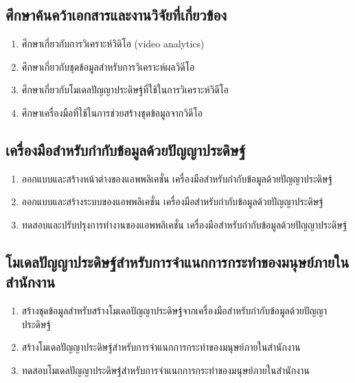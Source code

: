 \subsection*{ศึกษาค้นคว้าเอกสารและงานวิจัยที่เกี่ยวข้อง}
\begin{enumerate}\setlength\itemsep{-0.25em}
	\item ศึกษาเกี่ยวกับการวิเคราะห์วิดิโอ (video analytics)
	\item ศึกษาเกี่ยวกับชุดข้อมูลสำหรับการวิเคราะห์ผลวิดีโอ
	\item ศึกษาเกี่ยวกับโมเดลปัญญาประดิษฐ์ที่ใช้ในการวิเคราะห์วิดีโอ
	\item ศึกษาเครื่องมือที่ใช้ในการช่วยสร้างชุดข้อมูลจากวิดีโอ
\end{enumerate}
\subsection*{เครื่องมือสำหรับกำกับข้อมูลด้วยปัญญาประดิษฐ์}
\begin{enumerate}\setlength\itemsep{-0.25em}
	\item ออกแบบและสร้างหน้าต่างของแอพพลิเคชั่น เครื่องมือสำหรับกำกับข้อมูลด้วยปัญญาประดิษฐ์
	\item ออกแบบและสร้างระบบของแอพพลิเคชั่น เครื่องมือสำหรับกำกับข้อมูลด้วยปัญญาประดิษฐ์
	\item ทดสอบและปรับปรุงการทำงานของแอพพลิเคชั่น เครื่องมือสำหรับกำกับข้อมูลด้วยปัญญาประดิษฐ์
\end{enumerate}
\subsection*{โมเดลปัญญาประดิษฐ์สำหรับการจำแนกการกระทำของมนุษย์ภายในสำนักงาน}
\begin{enumerate}\setlength\itemsep{-0.25em}
	\item สร้างชุดข้อมูลสำหรับสร้างโมเดลปัญญาประดิษฐ์จากเครื่องมือสำหรับกำกับข้อมูลด้วยปัญญาประดิษฐ์
	\item สร้างโมเดลปัญญาประดิษฐ์สำหรับการจำแนกการกระทำของมนุษย์ภายในสำนักงาน
	\item ทดสอบโมเดลปัญญาประดิษฐ์สำหรับการจำแนกการกระทำของมนุษย์ภายในสำนักงาน
\end{enumerate}
\clearpage
